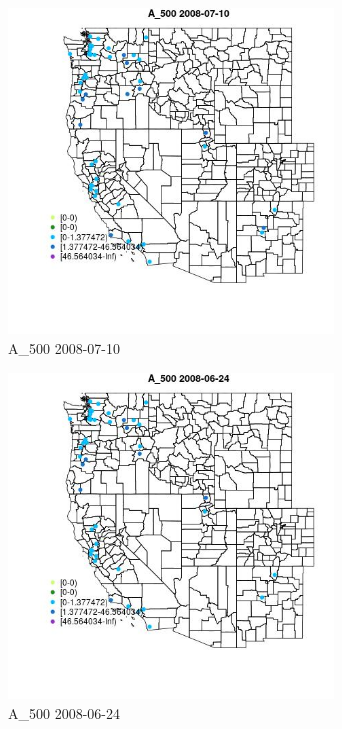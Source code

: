 \begin{figure} 
\centering  
\includegraphics[width=0.77\textwidth]{Code_Outputs/Report_ML_input_PM25_Step4_part_e_de_duplicated_aves_MapObsA_5002008-07-10.jpg} 
\caption{\label{fig:Report_ML_input_PM25_Step4_part_e_de_duplicated_avesMapObsA_5002008-07-10}A_500 2008-07-10} 
\end{figure} 
 

\begin{figure} 
\centering  
\includegraphics[width=0.77\textwidth]{Code_Outputs/Report_ML_input_PM25_Step4_part_e_de_duplicated_aves_MapObsA_5002008-06-24.jpg} 
\caption{\label{fig:Report_ML_input_PM25_Step4_part_e_de_duplicated_avesMapObsA_5002008-06-24}A_500 2008-06-24} 
\end{figure} 
 

